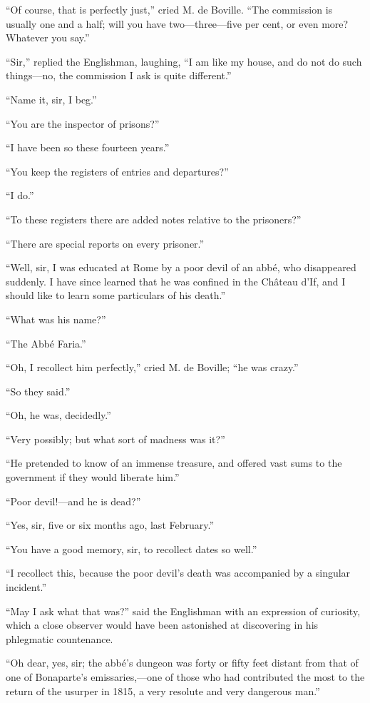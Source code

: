 “Of course, that is perfectly just,” cried M. de Boville. “The
commission is usually one and a half; will you have two—three—five per
cent, or even more? Whatever you say.”

“Sir,” replied the Englishman, laughing, “I am like my house, and do
not do such things—no, the commission I ask is quite different.”

“Name it, sir, I beg.”

“You are the inspector of prisons?”

“I have been so these fourteen years.”

“You keep the registers of entries and departures?”

“I do.”

“To these registers there are added notes relative to the prisoners?”

“There are special reports on every prisoner.”

“Well, sir, I was educated at Rome by a poor devil of an abbé, who
disappeared suddenly. I have since learned that he was confined in the
Château d’If, and I should like to learn some particulars of his
death.”

“What was his name?”

“The Abbé Faria.”

“Oh, I recollect him perfectly,” cried M. de Boville; “he was crazy.”

“So they said.”

“Oh, he was, decidedly.”

“Very possibly; but what sort of madness was it?”

“He pretended to know of an immense treasure, and offered vast sums to
the government if they would liberate him.”

“Poor devil!—and he is dead?”

“Yes, sir, five or six months ago, last February.”

“You have a good memory, sir, to recollect dates so well.”

“I recollect this, because the poor devil’s death was accompanied by a
singular incident.”

“May I ask what that was?” said the Englishman with an expression of
curiosity, which a close observer would have been astonished at
discovering in his phlegmatic countenance.

“Oh dear, yes, sir; the abbé’s dungeon was forty or fifty feet distant
from that of one of Bonaparte’s emissaries,—one of those who had
contributed the most to the return of the usurper in 1815, a very
resolute and very dangerous man.”

